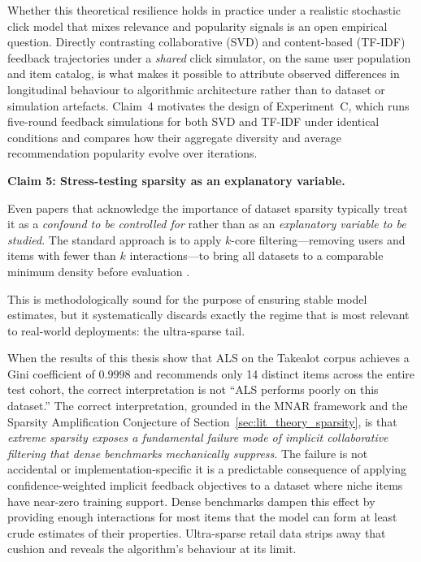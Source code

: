 \documentclass[11pt,a4paper]{report}
\begin{document}
Whether this theoretical resilience holds in practice under a realistic stochastic click model that mixes relevance and popularity signals is an open empirical question. Directly contrasting collaborative (SVD) and content-based (TF-IDF) feedback trajectories under a \emph{shared} click simulator, on the same user population and item catalog, is what makes it possible to attribute observed differences in longitudinal behaviour to algorithmic architecture rather than to dataset or simulation artefacts. Claim~4 motivates the design of Experiment~C, which runs five-round feedback simulations for both SVD and TF-IDF under identical conditions and compares how their aggregate diversity and average recommendation popularity evolve over iterations.

\vspace{0.75em}
\noindent\textbf{Claim 5: Stress-testing sparsity as an explanatory variable.}

Even papers that acknowledge the importance of dataset sparsity typically treat it as a \emph{confound to be controlled for} rather than as an \emph{explanatory variable to be studied}.
The standard approach is to apply $k$-core filtering---removing users and items with fewer than $k$ interactions---to bring all datasets to a comparable minimum density before evaluation \citep{he2020lightgcn, wang2019ngcf}.
 
 This is methodologically sound for the purpose of ensuring stable model estimates, but it systematically discards exactly the regime that is most relevant to real-world deployments: the ultra-sparse tail.

When the results of this thesis show that ALS on the Takealot corpus achieves a Gini coefficient of $0.9998$ and recommends only 14 distinct items across the entire test cohort, the correct interpretation is not ``ALS performs poorly on this dataset.'' The correct interpretation, grounded in the MNAR framework and the Sparsity Amplification Conjecture of Section~\ref{sec:lit_theory_sparsity}, is that \emph{extreme sparsity exposes a fundamental failure mode of implicit collaborative filtering that dense benchmarks mechanically suppress}. The failure is not accidental or implementation-specific it is a predictable consequence of applying confidence-weighted implicit feedback objectives to a dataset where niche items have near-zero training support. Dense benchmarks dampen this effect by providing enough interactions for most items that the model can form at least crude estimates of their properties. Ultra-sparse retail data strips away that cushion and reveals the algorithm's behaviour at its limit.
\end{document}
